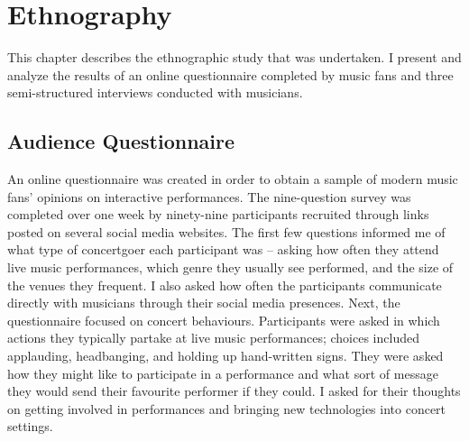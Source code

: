 \chapter{Ethnography}

This chapter describes the ethnographic study that was undertaken. I present and analyze the results of an online questionnaire completed by music fans and three semi-structured interviews conducted with musicians.

\section{Audience Questionnaire}

An online questionnaire was created in order to obtain a sample of modern music fans' opinions on interactive performances. The nine-question survey was completed over one week by ninety-nine participants recruited through links posted on several social media websites. The first few questions informed me of what type of concertgoer each participant was -- asking how often they attend live music performances, which genre they usually see performed, and the size of the venues they frequent. I also asked how often the participants communicate directly with musicians through their social media presences. Next, the questionnaire focused on concert behaviours. Participants were asked in which actions they typically partake at live music performances; choices included applauding, headbanging, and holding up hand-written signs. They were asked how they might like to participate in a performance and what sort of message they would send their favourite performer if they could. I asked for their thoughts on getting involved in performances and bringing new technologies into concert settings.

